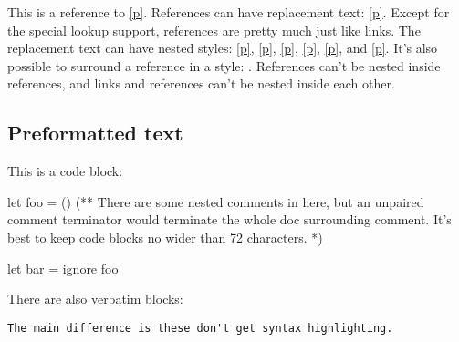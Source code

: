 This is a reference to \hyperref[module-Markup-val-foo]{[p\pageref*{module-Markup-val-foo}]}. References can have replacement text: \hyperref[module-Markup-val-foo]{[p\pageref*{module-Markup-val-foo}]}. Except for the special lookup support, references are pretty much just like links. The replacement text can have nested styles: \hyperref[module-Markup-val-foo]{[p\pageref*{module-Markup-val-foo}]}, \hyperref[module-Markup-val-foo]{[p\pageref*{module-Markup-val-foo}]}, \hyperref[module-Markup-val-foo]{[p\pageref*{module-Markup-val-foo}]}, \hyperref[module-Markup-val-foo]{[p\pageref*{module-Markup-val-foo}]}, \hyperref[module-Markup-val-foo]{[p\pageref*{module-Markup-val-foo}]}, and \hyperref[module-Markup-val-foo]{[p\pageref*{module-Markup-val-foo}]}. It's also possible to surround a reference in a style: . References can't be nested inside references, and links and references can't be nested inside each other.

\subsection{Preformatted text\label{preformatted-text}}%
This is a code block:\medbreak
\begin{ocamlcodeblock}
let foo = ()
(** There are some nested comments in here, but an unpaired comment
    terminator would terminate the whole doc surrounding comment. It's
    best to keep code blocks no wider than 72 characters. *)

let bar =
  ignore foo
\end{ocamlcodeblock}\medbreak
There are also verbatim blocks:

\begin{verbatim}The main difference is these don't get syntax highlighting.\end{verbatim}%
